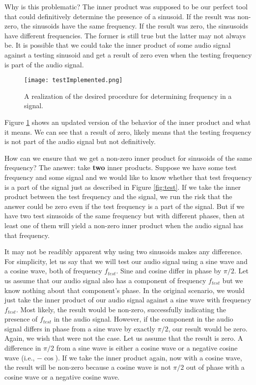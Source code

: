 Why is this problematic?  The inner product was supposed to be our perfect tool that could definitively determine
the presence of a sinusoid.  If the result was non-zero, the sinusoids have the same frequency.  If the result was
zero, the sinsusoids have different frequencies.  The former is still true but the latter may not always be.  It is 
possible that we could take the inner product of some audio signal against a testing sinusoid and get a result
of zero even when the testing frequency is part of the audio signal.  

\begin{figure}[h]
	\caption{A realization of the desired procedure for determining frequency in a signal.}
	\centering
	\texttt{[image: testImplemented.png]}
	\label{fig:testImplemented}
\end{figure}

\noindent Figure \ref{fig:testImplemented} shows an updated version of the behavior of the inner product and what it means.
We can see that a result of zero, likely means that the testing frequency is not part of the audio signal but not
definitively.

How can we ensure that we get a non-zero inner product for sinusoids of the same frequency?  The answer:
take \textbf{two} inner products.  Suppose we have some test frequency and some signal and we would like to 
know whether that test frequency is a part of the signal just as described in Figure \ref{fig:test}.  If we take
the inner product between the test frequency and the signal, we run the risk that the answer could be zero even
if the test frequency is a part of the signal.  But if we have two test sinusoids of the same frequency but with
different phases, then at least one of them will yield a non-zero inner product when the audio signal has
that frequency.  

It may not be readibly apparent why using two sinusoids makes any difference.  For simplicity, let us say that
we will test our audio signal using a sine wave and a cosine wave, both of frequency $f_{test}$.  Sine and cosine 
differ in phase by $\pi/2$.  Let us assume that our audio signal also has a component
of frequency $f_{test}$ but we know nothing about that component's phase.  In the original scenario, we would
just take the inner product of our audio signal against a sine wave with frequency $f_{test}$.  Most likely, the
result would be non-zero, successfully indicating the presence of $f_{test}$ in the audio signal.  However,
if the component in the audio signal differs in phase from a sine wave by exactly $\pi/2$, our result would be
zero.  Again, we wish that were not the case.  Let us assume that the result is zero.  A difference in $\pi/2$ from 
a sine wave is either a cosine wave or a negative cosine wave (i.e., $-\cos$).  If we  take the inner product again, 
now with a cosine wave, the result will be non-zero because a cosine wave is not $\pi/2$ out of phase with a 
cosine wave or a negative cosine wave.  

